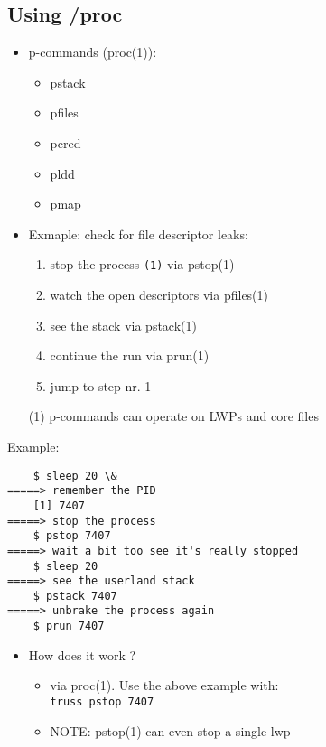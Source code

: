 \subsection{Using /proc}

\begin{itemize}
  \item p-commands (proc(1)):
     \begin{itemize}
     \item pstack
     \item pfiles
     \item pcred
     \item pldd
     \item pmap 
     \end{itemize}
  \item Exmaple: check for file descriptor leaks:
  \begin{enumerate}
    \item stop the process \texttt{(1)} via pstop(1)
    \item watch the open descriptors via pfiles(1)
    \item see the stack via pstack(1)
    \item continue the run via prun(1)
    \item jump to step nr. 1
  \end{enumerate}
\end{itemize}

\begin{itemize}
  \item[(1)] p-commands can operate on LWPs and core files
\end{itemize}

Example:

\begin{verbatim}
    $ sleep 20 \&
=====> remember the PID
    [1] 7407
=====> stop the process
    $ pstop 7407
=====> wait a bit too see it's really stopped
    $ sleep 20
=====> see the userland stack
    $ pstack 7407
=====> unbrake the process again
    $ prun 7407
\end{verbatim}

\begin{itemize}
\item How does it work ?
  \begin{itemize}
  \item via proc(1). Use the above example with: \\
    \texttt{truss pstop 7407}
  \item NOTE: pstop(1) can even stop a single lwp
  \end{itemize}
\end{itemize}

